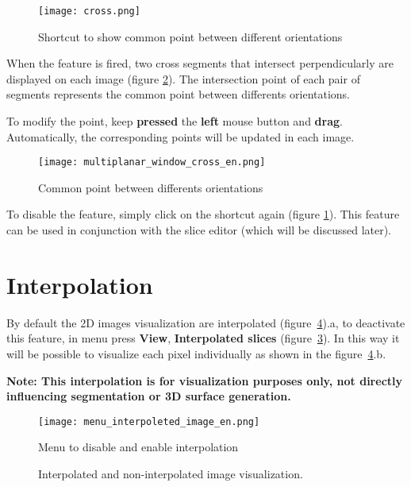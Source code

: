 \begin{figure}[!htb]
\centering
\texttt{[image: cross.png]}
\caption{Shortcut to show common point between different orientations}
\label{fig:cross_icon}
\end{figure}

When the feature is fired, two cross segments that intersect perpendicularly are displayed on each image (figure \ref{fig:cross_all}). The intersection point of each pair of segments represents the common point between differents orientations.

\newpage

To modify the point, keep \textbf{pressed} the \textbf{left} mouse button and
\textbf{drag}. Automatically, the corresponding points will be updated in each image.

\begin{figure}[!htb]
\centering
\texttt{[image: multiplanar\_window\_cross\_en.png]}
\caption{Common point between differents orientations}
\label{fig:cross_all}
\end{figure}

To disable the feature, simply click on the shortcut again (figure \ref{fig:cross_icon}). This feature can be used in conjunction with the slice editor (which will be discussed later).

\section{Interpolation}

By default the 2D images visualization are interpolated (figure~\ref{fig:interp}).a, to deactivate this feature, in menu press \textbf{View}, \textbf{Interpolated slices} (figure~\ref{fig:menu_interpoleted_image_pt}). In this way it will be possible to visualize each pixel individually as shown in the figure~\ref{fig:interp}.b.

\textbf{Note: This interpolation is for visualization purposes only, not directly influencing segmentation or 3D surface generation.}

\begin{figure}[!htb]
\centering
\texttt{[image: menu\_interpoleted\_image\_en.png]}
\caption{Menu to disable and enable interpolation}
\label{fig:menu_interpoleted_image_pt}
\end{figure}


\begin{figure}[!htb]
  \centering
    \qquad
  \hfill
  \caption{Interpolated and non-interpolated image visualization.}
  \label{fig:interp}
\end{figure}

